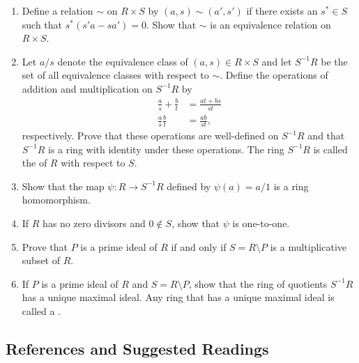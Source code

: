 {\begin{enumerate}
\begin{enumerate}
 \item
Define a relation $\sim$ on $R \times S$ by $(a, s) \sim (a', s')$ if
there exists an $s^\ast \in S$ such that $s^\ast(s' a -s a') =0$. Show that
$\sim$ is an equivalence relation on $R \times S$.
 
 
 \item
Let $a/s$ denote the equivalence class of $(a,s) \in R \times S$ and
let $ S^{-1}R$ be the set of all equivalence classes with respect to
$\sim$.  Define  the operations of addition and multiplication on
$S^{-1} R$ by
\begin{align*}
\frac{a}{s} + \frac{b}{t} & = \frac{at + b s}{s t} \\
\frac{a}{s}  \frac{b}{t} & = \frac{a b}{s t},
\end{align*}
respectively. Prove that these operations are well-defined on $S^{-1}R$
and that $S^{-1}R$ is a ring with identity under these operations.
The ring $S^{-1}R$ is called the  of $R$ with respect to $S$.


 
 \item
Show that the map $\psi : R \rightarrow S^{-1}R$ defined by $\psi(a)
= a/1$ is a ring homomorphism.
 
 \item
If $R$ has no zero divisors and $0 \notin S$, show that $\psi$ is
one-to-one.
 
 
\item
Prove that $P$ is a prime ideal of $R$ if and only if $S = R \setminus
P$ is a multiplicative subset of $R$. 
 
\item
If $P$ is a prime ideal of $R$ and $S = R \setminus P$, show that the
ring of quotients $S^{-1}R$ has a unique maximal ideal. Any ring
that has a unique maximal ideal is called a .  
 
 
\end{enumerate}



 
\end{enumerate}
}
 
 
 
\subsection*{References and Suggested Readings}
 
